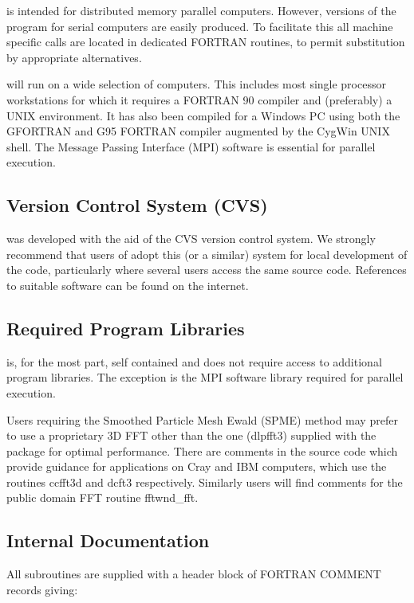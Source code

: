 \D{} is intended for distributed memory parallel computers.
However, versions of the program for serial computers are easily
produced. To facilitate this all machine specific calls are located in
dedicated FORTRAN routines, to permit substitution
by appropriate alternatives.

\D{} will run on a wide selection of computers. This includes most single
processor workstations for which it requires a FORTRAN 90 compiler and
(preferably) a UNIX environment. It has also been compiled for a Windows PC
using both the GFORTRAN and G95 FORTRAN compiler augmented by the CygWin UNIX
shell.  The Message Passing Interface (MPI) software is essential for parallel
execution.

\subsection{Version Control System (CVS)}

\D{} was developed with the aid of the CVS version control
system. We strongly recommend that users of \D{} adopt this (or a
similar) system for local development of the \D{} code, particularly
where several users access the same source code. References to
suitable software can be found on the internet.

\subsection{Required Program Libraries}

\D{} is, for the most part, self contained and does not require access
to additional program libraries. The exception is the MPI software
library required for parallel execution.  

Users requiring the Smoothed Particle Mesh Ewald (SPME)
 method may prefer to use
a proprietary 3D FFT other than the one ({\sc dlpfft3}) supplied with
the package for optimal performance. There are comments in the source
code which provide guidance for applications on Cray and IBM
computers, which use the routines {\sc ccfft3d} and {\sc dcft3}
respectively. Similarly users will find comments for the public domain
FFT routine {\sc fftwnd\_fft}.

\subsection{Internal Documentation}

All subroutines are supplied with a header block of
FORTRAN COMMENT
records giving:


